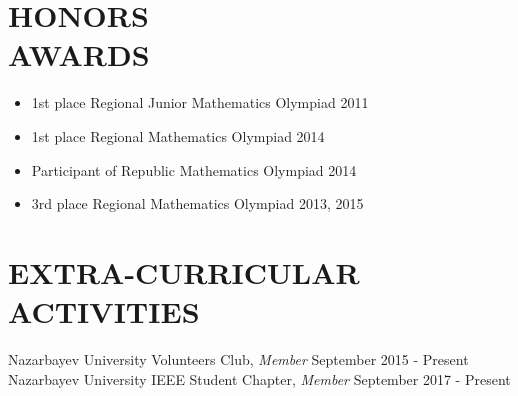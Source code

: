\documentclass[margin, 10pt]{res} %
\begin{document}
\begin{resume}
\begin{itemize}
\end{itemize}
 

\section{HONORS \\ AWARDS}
\begin{itemize}
\item 1st place Regional Junior Mathematics Olympiad \hfill 2011 
\item 1st place Regional Mathematics Olympiad  \hfill 2014 
\item Participant of Republic Mathematics Olympiad \hfill 2014 
\item 3rd place Regional Mathematics Olympiad \hfill 2013, 2015 



\end{itemize}


\section{EXTRA-CURRICULAR \\ ACTIVITIES} 

Nazarbayev University Volunteers Club, {\sl Member} \hfill September 2015 - Present\\
Nazarbayev University IEEE Student Chapter, {\sl Member} \hfill September 2017 - Present \\
 


\end{resume}
\end{document}
